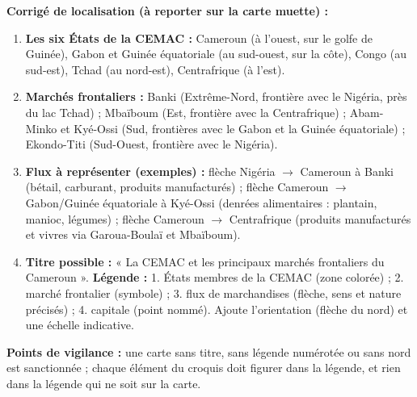 \documentclass[11pt]{article}
\begin{document}
\begin{corrige}
\textbf{Corrigé de localisation (à reporter sur la carte muette) :}
\begin{enumerate}
\item \textbf{Les six États de la CEMAC :} Cameroun (à l'ouest, sur le golfe de Guinée), Gabon et Guinée équatoriale (au sud-ouest, sur la côte), Congo (au sud-est), Tchad (au nord-est), Centrafrique (à l'est).
\item \textbf{Marchés frontaliers :} Banki (Extrême-Nord, frontière avec le Nigéria, près du lac Tchad) ; Mbaïboum (Est, frontière avec la Centrafrique) ; Abam-Minko et Kyé-Ossi (Sud, frontières avec le Gabon et la Guinée équatoriale) ; Ekondo-Titi (Sud-Ouest, frontière avec le Nigéria).
\item \textbf{Flux à représenter (exemples) :} flèche Nigéria $\rightarrow$ Cameroun à Banki (bétail, carburant, produits manufacturés) ; flèche Cameroun $\rightarrow$ Gabon/Guinée équatoriale à Kyé-Ossi (denrées alimentaires : plantain, manioc, légumes) ; flèche Cameroun $\rightarrow$ Centrafrique (produits manufacturés et vivres via Garoua-Boulaï et Mbaïboum).
\item \textbf{Titre possible :} « La CEMAC et les principaux marchés frontaliers du Cameroun ». \textbf{Légende :} 1. États membres de la CEMAC (zone colorée) ; 2. marché frontalier (symbole) ; 3. flux de marchandises (flèche, sens et nature précisés) ; 4. capitale (point nommé). Ajoute l'orientation (flèche du nord) et une échelle indicative.
\end{enumerate}
\textbf{Points de vigilance :} une carte sans titre, sans légende numérotée ou sans nord est sanctionnée ; chaque élément du croquis doit figurer dans la légende, et rien dans la légende qui ne soit sur la carte.
\end{corrige}
\end{document}
